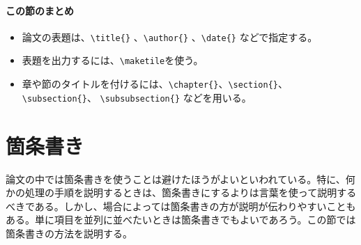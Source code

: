 \paragraph{この節のまとめ}

\begin{itemize}
\item 論文の表題は、\verb|\title{}| 、\verb|\author{}| 、\verb|\date{}| などで指定する。
\item 表題を出力するには、\verb|\maketile|を使う。
\item 章や節のタイトルを付けるには、\verb|\chapter{}|、\verb|\section{}|、 \verb|\subsection{}|、 \verb|\subsubsection{}| などを用いる。
\end{itemize}

\section{箇条書き}
\label{sec:latex:itemize}

論文の中では箇条書きを使うことは避けたほうがよいといわれている。特に、何かの処理の手順を説明するときは、箇条書きにするよりは言葉を使って説明するべきである。しかし、場合によっては箇条書きの方が説明が伝わりやすいこともある。単に項目を並列に並べたいときは箇条書きでもよいであろう。この節では箇条書きの方法を説明する。

